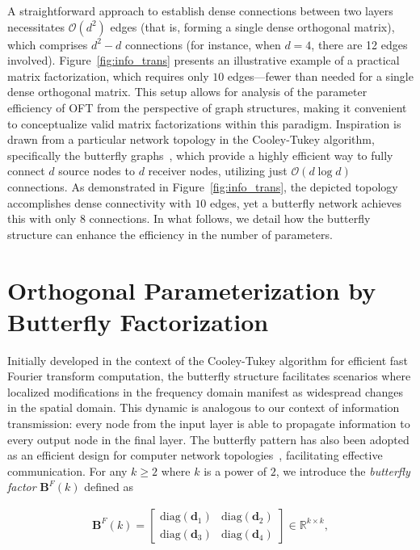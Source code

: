 A straightforward approach to establish dense connections between two layers necessitates $\mathcal{O}(d^2)$ edges (that is, forming a single dense orthogonal matrix), which comprises $d^2-d$ connections (for instance, when $d=4$, there are 12 edges involved). Figure~\ref{fig:info_trans} presents an illustrative example of a practical matrix factorization, which requires only $10$ edges—fewer than needed for a single dense orthogonal matrix. This setup allows for analysis of the parameter efficiency of OFT from the perspective of graph structures, making it convenient to conceptualize valid matrix factorizations within this paradigm. Inspiration is drawn from a particular network topology in the Cooley-Tukey algorithm, specifically the butterfly graphs~\cite{cooley1965algorithm}, which provide a highly efficient way to fully connect $d$ source nodes to $d$ receiver nodes, utilizing just $\mathcal{O}(d\log d)$ connections. As demonstrated in Figure~\ref{fig:info_trans}, the depicted topology accomplishes dense connectivity with $10$ edges, yet a butterfly network achieves this with only $8$ connections. In what follows, we detail how the butterfly structure can enhance the efficiency in the number of parameters.

\section{Orthogonal Parameterization by Butterfly Factorization}

Initially developed in the context of the Cooley-Tukey algorithm for efficient fast Fourier transform computation, the butterfly structure facilitates scenarios where localized modifications in the frequency domain manifest as widespread changes in the spatial domain. This dynamic is analogous to our context of information transmission: every node from the input layer is able to propagate information to every output node in the final layer. The butterfly pattern has also been adopted as an efficient design for computer network topologies~\cite{solihin2015fundamentals,li2011linear}, facilitating effective communication. For any $k \geq 2$ where $k$ is a power of $2$, we introduce the \emph{butterfly factor} $\bm{B}^F(k)$ defined as

\begin{equation}\label{eq:but_factor}
\begin{aligned}
    \bm{B}^F(k)=\begin{bmatrix}
    \text{diag}(\bm{d}_1) & \text{diag}(\bm{d}_2) \\
    \text{diag}(\bm{d}_3) & \text{diag}(\bm{d}_4)
    \end{bmatrix}\in\mathbb{R}^{k\times k},
\end{aligned}
\end{equation}

